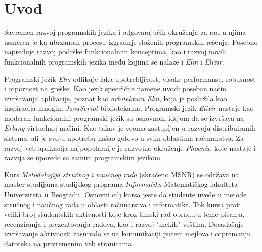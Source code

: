 \documentclass[12pt,oneside]{memoir}
\begin{document}
\frontmatter
\naslovna
\komisija
\apstrakt
\tableofcontents*

\mainmatter

\chapter{Uvod}
Savremen razvoj programskih jezika i odgovarajućih okruženja za rad u njima
usmeren je ka ubrzanom procesu izgradnje složenih programskih rešenja. Posebno
napreduje razvoj podrške funkcionalnim konceptima, kao i razvoj novih funkcionalnih
programskih jezika među kojima se nalaze i \emph{Elm} i \emph{Elixir}. 

Programski jezik \emph{Elm} odlikuje laka upotrebljivost, visoke performanse,
robusnost i otpornost na greške. Kao jezik specifične namene uvodi poseban
način izvršavanja aplikacije, poznat kao \emph{arhitektura Elm}, koja je
poslužila kao inspiracija mnogim \emph{JavaScript} bibliotekama.
Programski jezik \emph{Elixir} nastaje kao moderan funkcionalni programski jezik
sa osnovnom idejom da se izvršava na \emph{Erlang} virtuelnoj mašini. Kao takav je veoma zastupljen u razvoju distribuiranih sistema,
ali je svoju upotrebu našao gotovo u svim oblastima računarstva.
Za razvoj veb aplikacija najpopularnije je razvojno okruženje \emph{Phoenix}, koje
nastaje i razvija se uporedo sa samim programskim jezikom.

Kurs \emph{Metodologija stručnog i naučnog rada} (skraćeno MSNR) se održava na master studijama
studijskog programa \emph{Informatika} Matematičkog fakulteta Univerziteta u Beogradu.
Osnovni cilj kursa jeste da studente uvede u metode stručnog i naučnog rada u oblasti računarstva
i informatike. Tok kursa prati veliki broj studentskih aktivnosti koje kroz timski rad
obrađuju teme pisanja, recenziranja i prezentovanja radova, kao i razvoj "mekih" veština.
Dosadašnje izvršavanje aktivnosti zasnivalo se na komunikaciji putem mejlova i otpremanju datoteka na
privremenim veb stranicama.
\end{document}
